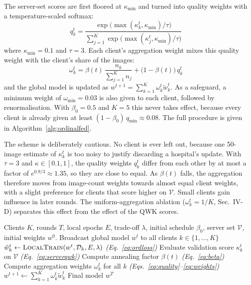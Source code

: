 The server-set scores are first floored at $\kappa_{\min}$ and turned into quality
weights with a temperature-scaled softmax:
\begin{equation}
q_k^t = \frac{\exp\!\big(\max(\kappa_k^t, \kappa_{\min}) / \tau\big)}
             {\sum_{j=1}^{K} \exp\!\big(\max(\kappa_j^t, \kappa_{\min}) / \tau\big)}
\label{eq:quality}
\end{equation}
where $\kappa_{\min} = 0.1$ and $\tau = 3$. Each client's aggregation weight mixes
this quality weight with the client's share of the images:
\begin{equation}
\omega_k^t = \beta(t)\,\frac{n_k}{\sum_{j=1}^{K} n_j}
           + \big(1 - \beta(t)\big)\, q_k^t
\label{eq:weights}
\end{equation}
and the global model is updated as $w^{t+1} = \sum_{k=1}^{K} \omega_k^t \tilde{w}_k^t$.
As a safeguard, a minimum weight of $\omega_{\min} = 0.03$ is also given to each
client, followed by renormalisation. With $\beta_0 = 0.5$ and $K = 5$ this never
takes effect, because every client is already given at least
$(1-\beta_0)\,q_{\min} \approx 0.08$. The full procedure is given in
Algorithm~\ref{alg:ordinalfed}.

The scheme is deliberately cautious. No client is ever left out, because one
50-image estimate of $\kappa_k^t$ is too noisy to justify discarding a hospital's
update. With $\tau = 3$ and $\kappa \in [0.1, 1]$, the quality weights
$q_k^t$ differ from each other by at most a factor of $e^{0.9/3} \approx 1.35$, so
they are close to equal. As $\beta(t)$ falls, the aggregation therefore moves from
image-count weights towards almost equal client weights, with a slight preference
for clients that score higher on $\mathcal{V}$. Small clients gain influence in
later rounds. The uniform-aggregation ablation ($\omega_k^t = 1/K$, Sec.~IV-D)
separates this effect from the effect of the QWK scores.

\begin{algorithm}[t]
\caption{OrdinalFed Training Pipeline}
\label{alg:ordinalfed}
\small
\begin{algorithmic}[1]
\REQUIRE Clients $K$, rounds $T$, local epochs $E$, trade-off $\lambda$,
         initial schedule $\beta_0$, server set $\mathcal{V}$, initial weights $w^0$.
  \STATE Broadcast global model $w^t$ to all clients $k \in \{1,\ldots,K\}$
    \STATE $\tilde{w}_k^t \leftarrow \textsc{LocalTrain}(w^t, \mathcal{D}_k, E, \lambda)$
           \hfill\textit{(Eq.~\ref{eq:ordloss})}
    \STATE Evaluate validation score $\kappa_k^t$ on $\mathcal{V}$
           \hfill\textit{(Eq.~\ref{eq:serverqwk})}
  \ENDFOR
  \STATE Compute annealing factor $\beta(t)$
         \hfill\textit{(Eq.~\ref{eq:beta})}
  \STATE Compute aggregation weights $\omega_k^t$ for all $k$
         \hfill\textit{(Eqs.~\ref{eq:quality}--\ref{eq:weights})}
  \STATE $w^{t+1} \leftarrow \sum_{k=1}^{K} \omega_k^t \tilde{w}_k^t$
\ENDFOR
\RETURN Final model $w^T$
\end{algorithmic}
\end{algorithm}

